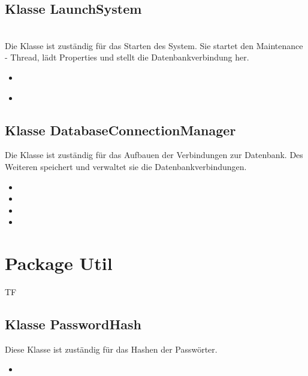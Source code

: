 	\subsection{Klasse LaunchSystem}
	\\
	Die Klasse ist zuständig für das Starten des System. Sie startet den Maintenance - Thread, lädt Properties und stellt die Datenbankverbindung her.
	\begin{itemize}
		\item {}\\
		\item {}\\
	\end{itemize}
	
	\subsection{Klasse DatabaseConnectionManager}
	Die Klasse ist zuständig für das Aufbauen der Verbindungen zur Datenbank. Des Weiteren
	speichert und verwaltet sie die Datenbankverbindungen. 
	\begin{itemize}
		\item {}
		\item {}
		\item {}
		\item {}
	\end{itemize}
	
	
	\section{Package Util}
	\begin{tiny}
		TF
	\end{tiny}
	\subsection{Klasse PasswordHash}
	Diese Klasse ist zuständig für das Hashen der Passwörter.
	\begin{itemize}
		\item {}
	\end{itemize}
	

